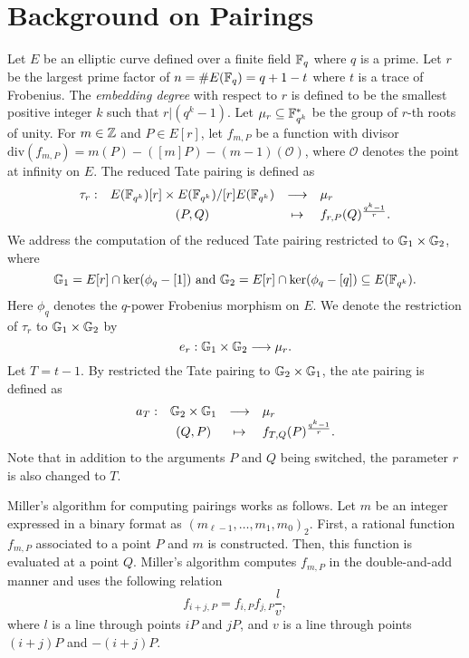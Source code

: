 \section{Background on Pairings}
\label{sec:background}

Let $E$ be an elliptic curve defined over a finite field $\mathbb{F}_{q}$ where $q$ is a prime.
Let $r$ be the largest prime factor of $n = \#E(\mathbb{F}_{q}) = q + 1 - t$ where $t$ is a trace of Frobenius.
The \emph{embedding degree} with respect to $r$ is defined to be the smallest positive integer $k$ such that $r | (q^k-1)$.
Let $\mu_{r} \subseteq \mathbb{F}_{q^{k}}^{*}$ be the group of $r$-th roots of unity.
For $m \in \mathbb{Z}$ and $P \in E[r]$,
let $f_{m,P}$ be a function with divisor 
$\text{div}(f_{m,P}) = m(P) - ([m]P) - (m-1)(\mathcal{O})$,
where $\mathcal{O}$ denotes the point at infinity on $E$.
The reduced Tate pairing is defined as
\[\begin{array}{rccl}
\tau_{r} :	& E(\mathbb{F}_{q^{k}})[r] \times E(\mathbb{F}_{q^{k}})/[r]E(\mathbb{F}_{q^{k}})	& \longrightarrow	& \mu_{r} \\
		& (P,Q)								& \mapsto		& f_{r,P}(Q)^{\frac{q^{k}-1}{r}}.
\end{array}\]
We address the computation of the reduced Tate pairing restricted to $\mathbb{G}_{1} \times \mathbb{G}_{2}$, where
$$\mathbb{G}_{1} = E[r] \cap \ker(\phi_{q}-[1]) \text{ and }
\mathbb{G}_{2} = E[r] \cap \ker(\phi_{q} - [q]) \subseteq E(\mathbb{F}_{q^{k}}).$$
Here $\phi_{q}$ denotes the $q$-power Frobenius morphism on $E$.
We denote the restriction of $\tau_{r}$ to $\mathbb{G}_{1} \times \mathbb{G}_{2}$ by
$$e_{r} : \mathbb{G}_{1} \times \mathbb{G}_{2} \longrightarrow \mu_{r}.$$
Let $T = t-1$.
By restricted the Tate pairing to $\mathbb{G}_{2} \times \mathbb{G}_{1}$, the ate pairing is defined as
\[\begin{array}{rccl}
a_{T} :	& \mathbb{G}_{2} \times \mathbb{G}_{1}	& \longrightarrow	& \mu_{r} \\
	& (Q,P) 		& \mapsto		& f_{T,Q}(P)^{\frac{q^{k}-1}{r}}.
\end{array}\]
Note that in addition to the arguments $P$ and $Q$ being switched, the parameter $r$ is also changed to $T$.

Miller's algorithm for computing pairings works as follows.
Let $m$ be an integer expressed in a binary format as $(m_{\ell-1},\dots,m_1,m_0)_2$.
First, a rational function $f_{m,P}$ associated to a point $P$ and $m$ is constructed.
Then, this function is evaluated at a point $Q$.
Miller's algorithm computes $f_{m,P}$ in the double-and-add manner
and uses the following relation
$$ f_{i+j,P} = f_{i,P} f_{j,P} \frac{l}{v}, $$
where $l$ is a line through points $iP$ and $jP$,
and $v$ is a line through points $(i+j)P$ and $-(i+j)P$.


